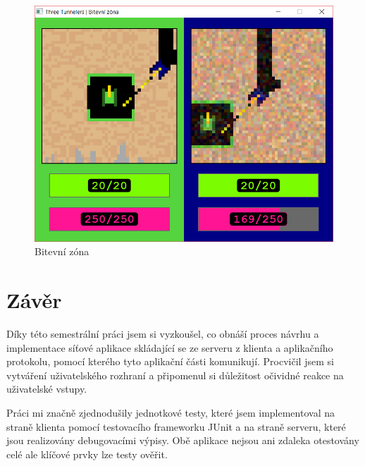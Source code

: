 \documentclass[12pt,a4paper]{article}
\let\oldsection\section
\renewcommand\section{\clearpage\oldsection}
\begin{document}
\begin{figure}[h]
    \centering
    \begin{minipage}{0.60\textwidth}
        \includegraphics[width=1\textwidth]{img/05_battle.png}
    	\caption{Bitevní zóna}
		\label{fig:battle}
    \end{minipage}\hfill
\end{figure}
\section{Závěr}
Díky této semestrální práci jsem si vyzkoušel, co obnáší proces návrhu a implementace síťové aplikace skládající se ze serveru z klienta a aplikačního protokolu, pomocí kterého tyto aplikační části komunikují.
Procvičil jsem si vytváření uživatelského rozhraní a připomenul si důležitost očividné reakce na uživatelské vstupy.

Práci mi značně zjednodušily jednotkové testy, které jsem implementoval na straně klienta pomocí testovacího frameworku JUnit a na straně serveru, které jsou realizovány debugovacími výpisy. Obě aplikace nejsou ani zdaleka otestovány celé ale klíčové prvky lze testy ověřit.

\end{document}
